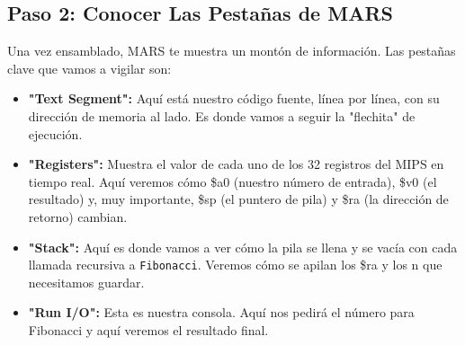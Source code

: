 \documentclass{article}
\begin{document}
\subsection*{Paso 2: Conocer Las Pestañas de MARS}
Una vez ensamblado, MARS te muestra un montón de información. Las pestañas clave que vamos a vigilar son:
\begin{itemize}
    \item \textbf{"Text Segment":} Aquí está nuestro código fuente, línea por línea, con su dirección de memoria al lado. Es donde vamos a seguir la "flechita" de ejecución.
    \item \textbf{"Registers":} Muestra el valor de cada uno de los 32 registros del MIPS en tiempo real. Aquí veremos cómo \$a0 (nuestro número de entrada), \$v0 (el resultado) y, muy importante, \$sp (el puntero de pila) y \$ra (la dirección de retorno) cambian.
    \item \textbf{"Stack":} Aquí es donde vamos a ver cómo la pila se llena y se vacía con cada llamada recursiva a \texttt{Fibonacci}. Veremos cómo se apilan los \$ra y los n que necesitamos guardar.
    \item \textbf{"Run I/O":} Esta es nuestra consola. Aquí nos pedirá el número para Fibonacci y aquí veremos el resultado final.
\end{itemize}
\end{document}
